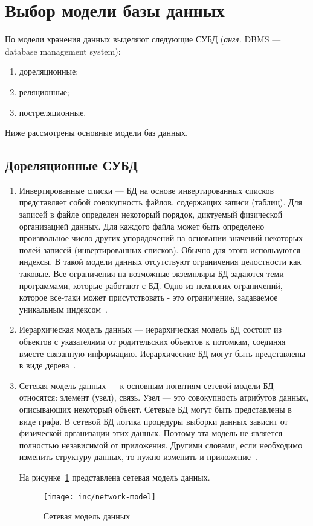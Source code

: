 \section{Выбор модели базы данных}
По модели хранения данных выделяют следующие СУБД \newline(\textit{англ.} DBMS --- database management system):

\begin{enumerate}[label=\arabic*)]
    \item дореляционные;
    \item реляционные;
    \item постреляционные.
\end{enumerate}

Ниже рассмотрены основные модели баз данных.

\subsection{Дореляционные СУБД}
\begin{enumerate}[label=\arabic*.]
    \item Инвертированные списки --- БД на основе инвертированных списков представляет собой совокупность файлов, содержащих записи (таблиц).
    Для записей в файле определен некоторый порядок, диктуемый физической организацией данных.
    Для каждого файла может быть определено произвольное число других упорядочений на основании значений некоторых полей записей (инвертированных списков).
    Обычно для этого используются индексы.
    В такой модели данных отсутствуют ограничения целостности как таковые.
    Все ограничения на возможные экземпляры БД задаются теми программами, которые работают с БД.
    Одно из немногих ограничений, которое все-таки может присутствовать - это ограничение, задаваемое уникальным индексом~\cite{lekcii}.
    \item Иерархическая модель данных --- иерархическая модель БД состоит из объектов с указателями от родительских объектов к потомкам, соединяя вместе связанную информацию.
    Иерархические БД могут быть представлены в виде дерева~\cite{lekcii}.
    \item Сетевая модель данных --- к основным понятиям сетевой модели БД относятся: элемент (узел), связь.
    Узел — это совокупность атрибутов данных, описывающих некоторый объект.
    Сетевые БД могут быть представлены в виде графа.
    В сетевой БД логика процедуры выборки данных зависит от физической организации этих данных.
    Поэтому эта модель не является полностью независимой от приложения.
    Другими словами, если необходимо изменить структуру данных, то нужно изменить и приложение~\cite{lekcii}.

    На рисунке~\ref{fig:network-model} представлена сетевая модель данных.

    \begin{figure}[h]
        \begin{center}
            \texttt{[image: inc/network-model]}
            \caption{Сетевая модель данных}
            \label{fig:network-model}
        \end{center}
    \end{figure}
\end{enumerate}

